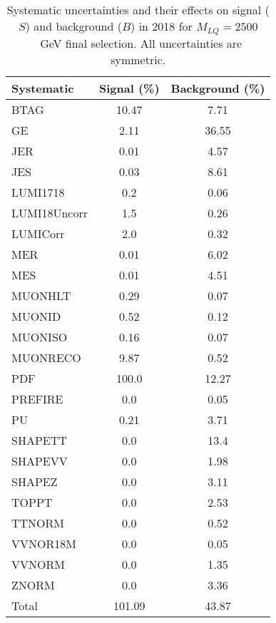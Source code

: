 \begin{table}[htbp]
\begin{center}
\caption{Systematic uncertainties and their effects on signal ($S$) and background ($B$) in 2018 for $M_{LQ}=2500$~GeV final selection. All uncertainties are symmetric.}
\begin{tabular}{lcc}
\hline\hline
Systematic & Signal (\%) & Background (\%) \\ \hline 
BTAG & 10.47 & 7.71\\ 
GE & 2.11 & 36.55\\ 
JER & 0.01 & 4.57\\ 
JES & 0.03 & 8.61\\ 
LUMI1718 & 0.2 & 0.06\\ 
LUMI18Uncorr & 1.5 & 0.26\\ 
LUMICorr & 2.0 & 0.32\\ 
MER & 0.01 & 6.02\\ 
MES & 0.01 & 4.51\\ 
MUONHLT & 0.29 & 0.07\\ 
MUONID & 0.52 & 0.12\\ 
MUONISO & 0.16 & 0.07\\ 
MUONRECO & 9.87 & 0.52\\ 
PDF & 100.0 & 12.27\\ 
PREFIRE & 0.0 & 0.05\\ 
PU & 0.21 & 3.71\\ 
SHAPETT & 0.0 & 13.4\\ 
SHAPEVV & 0.0 & 1.98\\ 
SHAPEZ & 0.0 & 3.11\\ 
TOPPT & 0.0 & 2.53\\ 
TTNORM & 0.0 & 0.52\\ 
VVNOR18M & 0.0 & 0.05\\ 
VVNORM & 0.0 & 1.35\\ 
ZNORM & 0.0 & 3.36\\ 
Total & 101.09 & 43.87\\ \hline \hline
\end{tabular}
\label{tab:SysUncertainties_uujj_2500}
\end{center}
\end{table}

